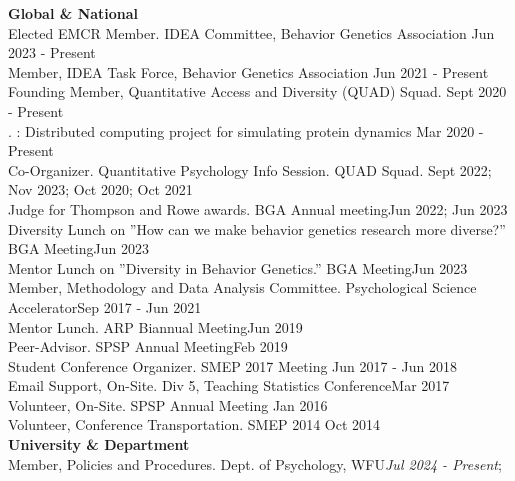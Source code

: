 {\large \textbf{Global \& National}}\\
Elected EMCR Member. IDEA Committee, Behavior Genetics Association \hfill{Jun 2023 - Present}\\ %
Member, IDEA Task Force, Behavior Genetics Association \hfill{Jun 2021 - Present}\\
Founding Member, Quantitative Access and Diversity (QUAD) Squad. \hfill{Sept 2020 - Present}\\%
. : Distributed computing project for simulating protein dynamics \hfill{Mar 2020 - Present}\\
Co-Organizer. Quantitative Psychology Info Session. QUAD Squad. \hfill{Sept 2022; Nov 2023;}\newline
\hspace*{0pt}\hfill{Oct 2020; Oct 2021}\smallskip\\
Judge for Thompson and Rowe awards. BGA Annual meeting\hfill{Jun 2022; Jun 2023}\\
Diversity Lunch on ''How can we make behavior genetics research more diverse?'' BGA Meeting\hfill{Jun 2023}\\
Mentor Lunch on ''Diversity in Behavior Genetics.'' BGA Meeting\hfill{Jun 2023}\\
Member, Methodology and Data Analysis Committee. Psychological Science Accelerator\hfill{Sep 2017 - Jun 2021}\\
Mentor Lunch. ARP Biannual Meeting\hfill{Jun 2019}\\
Peer-Advisor. SPSP Annual Meeting\hfill{Feb 2019}\\
Student Conference Organizer. SMEP 2017 Meeting \hfill{Jun 2017 - Jun 2018}\\
Email Support, On-Site. Div 5, Teaching Statistics Conference\hfill{Mar 2017}\\
Volunteer, On-Site. SPSP Annual Meeting \hfill{Jan 2016}\\
Volunteer, Conference Transportation. SMEP 2014  \hfill{Oct 2014}\medskip\\
{\large \textbf{University \& Department}}\\
Member, Policies and Procedures. Dept. of Psychology, WFU\hfill{\textit{Jul 2024 - Present};}\newline 
